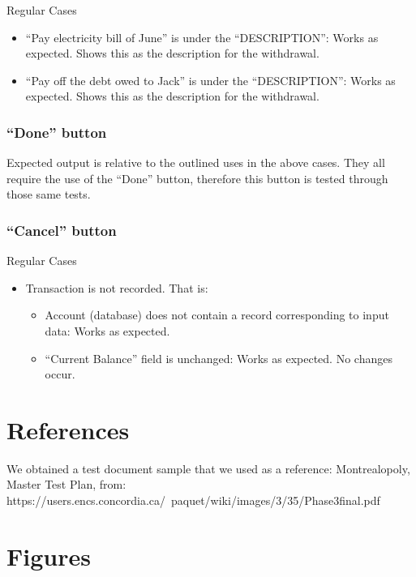 \documentclass[12pt]{article}
\begin{document}
Regular Cases
\begin{itemize}
  \item  “Pay electricity bill of June” is under the “DESCRIPTION”: Works as expected. Shows this as the description for the withdrawal.
  \item  “Pay off the debt owed to Jack” is under the “DESCRIPTION”: Works as expected. Shows this as the description for the withdrawal.
\end{itemize}

\subsubsection{“Done” button}

Expected output is relative to the outlined uses in the above cases. They all require the use of the “Done” button, therefore this button is tested through those same tests.
	
\subsubsection{“Cancel” button}

Regular Cases
\begin{itemize}
  \item Transaction is not recorded. That is:
  \begin{itemize}
    \item Account (database) does not contain a record corresponding to input data: Works as expected.
    \item “Current Balance” field is unchanged: Works as expected. No changes occur.
  \end{itemize}
\end{itemize}

\section{References}
We obtained a test document sample that we used as a reference: Montrealopoly, Master Test Plan, from: https://users.encs.concordia.ca/~paquet/wiki/images/3/35/Phase3final.pdf

\section{Figures}
\end{document}
